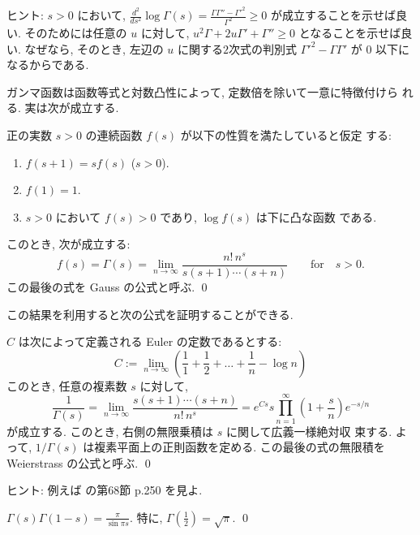 \documentclass[12pt,twoside]{jarticle}
\begin{document}
\noindent ヒント: $s > 0$ において, %
\(
  \frac{d^2}{ds^2}\log\Gamma(s)
  = \frac{\Gamma\Gamma'' - {\Gamma'}^2}{\Gamma^2}
  \ge 0
\)%
が成立することを示せば良い. そのためには任意の $u$ に対して,
$u^2\Gamma+2u\Gamma'+\Gamma''\ge0$ となることを示せば良い. なぜなら, 
そのとき, 左辺の $u$ に関する$2$次式の判別式 %
${\Gamma'}^2 - \Gamma\Gamma'$ が $0$ 以下になるからである.

ガンマ函数は函数等式と対数凸性によって, 定数倍を除いて一意に特徴付けら
れる. 実は次が成立する.

\begin{question}
  正の実数 $s > 0$ の連続函数 $f(s)$ が以下の性質を満たしていると仮定
  する:
  \begin{enumerate}
  \item $f(s+1) = s f(s)$ \quad ($s > 0$).
  \item $f(1) = 1$.
  \item $s > 0$ において $f(s) > 0$ であり, $\log f(s)$ は下に凸な函数
    である.
  \end{enumerate}
  このとき, 次が成立する:
  \[
    f(s)
    = \Gamma(s)
    = \lim_{n\to\infty} \frac{n!\,n^s}{s(s+1)\cdots(s+n)}
    \qquad\text{for}\quad s > 0.
  \]
  この最後の式を Gauss の公式と呼ぶ.
  \qed
\end{question}

\noindent この結果を利用すると次の公式を証明することができる.

\begin{question}
  $C$ は次によって定義される Euler の定数であるとする:
  \[
    C :=
    \lim_{n\to\infty}
    \left( \frac{1}{1} + \frac{1}{2} + \dots + \frac{1}{n} - \log n\right)
  \]%
  このとき, 任意の複素数 $s$ に対して,
  \[
    \frac{1}{\Gamma(s)}
    =
    \lim_{n\to\infty}
    \frac{s(s+1)\cdots(s+n)}{n!\,n^s}
    =
    e^{Cs} s \prod_{n=1}^{\infty}\left( 1 + \frac{s}{n} \right) e^{-s/n}
  \]%
  が成立する. このとき, 右側の無限乗積は $s$ に関して広義一様絶対収
  束する. よって, $1/\Gamma(s)$ は複素平面上の正則函数を定める. 
  この最後の式の無限積を Weierstrass の公式と呼ぶ.
  \qed
\end{question}

\noindent ヒント: 例えば \cite{kaiseki-gairon}の第68節 p.250 を見よ. 

\begin{question}
\label{q:Gamma-and-Sin}
  \(
  \displaystyle
    \Gamma(s)\Gamma(1-s) = \frac{\pi}{\sin \pi s}.
  \)
  \quad
  特に, 
  \(
  \displaystyle
    \Gamma\left( \frac{1}{2} \right) = \sqrt{\pi}.
  \)
  \qed
\end{question}
\end{document}
